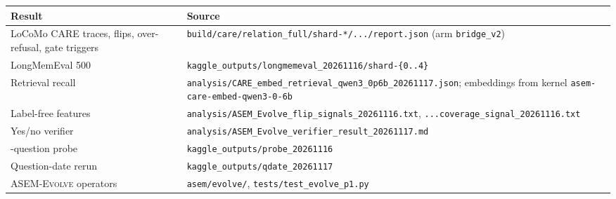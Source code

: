 \documentclass[11pt]{article}
\newcommand{\care}{\textsc{CARE}}
\newcommand{\evolve}{\textsc{ASEM-Evolve}}
\begin{document}
{\footnotesize
\begin{tabular}{>{\raggedright\arraybackslash}p{4.0cm}>{\raggedright\arraybackslash}p{11.5cm}}
\toprule
Result & Source \\
\midrule
LoCoMo \care{} traces, flips, over-refusal, gate triggers & \texttt{build/care/relation\_full/shard-*/\allowbreak .../report.json} (arm \texttt{bridge\_v2}) \\
LongMemEval 500 & \texttt{kaggle\_outputs/\allowbreak longmemeval\_20261116/\allowbreak shard-\{0..4\}} \\
Retrieval recall & \texttt{analysis/\allowbreak CARE\_embed\_retrieval\_qwen3\_0p6b\_20261117.json}; embeddings from kernel \texttt{asem-care-embed-qwen3-0-6b} \\
Label-free features & \texttt{analysis/\allowbreak ASEM\_Evolve\_flip\_signals\_20261116.txt}, \texttt{...coverage\_signal\_20261116.txt} \\
Yes/no verifier & \texttt{analysis/\allowbreak ASEM\_Evolve\_verifier\_result\_20261117.md} \\
30-question probe & \texttt{kaggle\_outputs/\allowbreak probe\_20261116} \\
Question-date rerun & \texttt{kaggle\_outputs/\allowbreak qdate\_20261117} \\
\evolve{} operators & \texttt{asem/evolve/}, \texttt{tests/test\_evolve\_p1.py} \\
\bottomrule
\end{tabular}}
\end{document}
